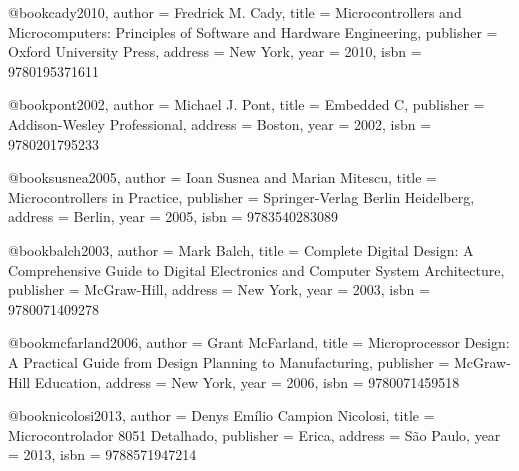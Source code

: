 %

@book{cady2010,
  author = {Fredrick M. Cady},
  title = {Microcontrollers and Microcomputers: Principles of Software and Hardware Engineering},
  publisher = {Oxford University Press},
  address = {New York},
  year = {2010},
  isbn = {9780195371611}
}

@book{pont2002,
  author = {Michael J. Pont},
  title = {Embedded C},
  publisher = {Addison-Wesley Professional},
  address = {Boston},
  year = {2002},
  isbn = {9780201795233}
}

@book{susnea2005,
  author = {Ioan Susnea and Marian Mitescu},
  title = {Microcontrollers in Practice},
  publisher = {Springer-Verlag Berlin Heidelberg},
  address = {Berlin},
  year = {2005},
  isbn = {9783540283089}
}

@book{balch2003,
  author = {Mark Balch},
  title = {Complete Digital Design: A Comprehensive Guide to Digital Electronics and Computer System Architecture},
  publisher = {McGraw-Hill},
  address = {New York},
  year = {2003},
  isbn = {9780071409278}
}

@book{mcfarland2006,
  author = {Grant McFarland},
  title = {Microprocessor Design: A Practical Guide from Design Planning to Manufacturing},
  publisher = {McGraw-Hill Education},
  address = {New York},
  year = {2006},
  isbn = {9780071459518}
}

@book{nicolosi2013,
  author = {Denys Emílio Campion Nicolosi},
  title = {Microcontrolador 8051 Detalhado},
  publisher = {Erica},
  address = {São Paulo},
  year = {2013},
  isbn = {9788571947214}
}

